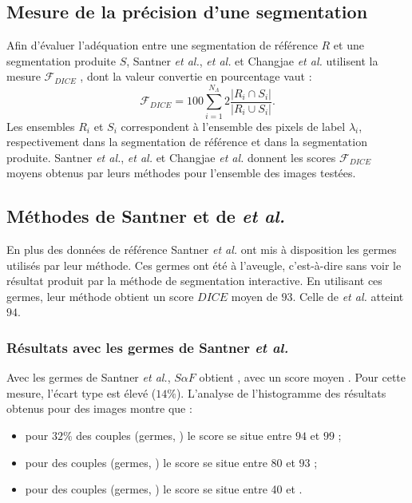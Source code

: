 \subsection{Mesure de la précision d'une segmentation}

Afin d'évaluer l'adéquation entre une segmentation de référence $R$ et une segmentation produite $S$, Santner \textit{et al.},   \textit{et al.} et Changjae \textit{et al.} utilisent la mesure $\mathcal{F}_{DICE}$ \cite{santner2010interactive}, dont la valeur convertie en pourcentage vaut :
\begin{equation}
\label{eq:dice}
\mathcal{F}_{DICE} = 100 \sum_{i=1}^{N_{\Lambda}} 2 \frac{|R_{i} \cap S_{i} |}{|R_{i} \cup S_{i}|}\text{.}
\end{equation}
Les ensembles $R_{i}$ et $S_{i}$ correspondent à l'ensemble des pixels de label $\lambda_{i}$, respectivement dans la segmentation de référence et dans la segmentation produite. Santner \textit{et al.},  \textit{et al.} et Changjae \textit{et al.} donnent les scores $\mathcal{F}_{DICE}$ moyens obtenus par leurs méthodes pour l'ensemble des images testées.


\subsection{Méthodes de Santner  et de  \textit{et al.}}

En plus des données de référence\modif{,} Santner \textit{et al.} \cite{santner2010interactive} ont mis à disposition les germes utilisés par leur méthode. Ces germes ont été  à l'aveugle, c'est-à-dire sans voir le résultat produit par la méthode de segmentation interactive. En utilisant ces germes, leur méthode obtient un score $DICE$ moyen de $93$. Celle de  \textit{et al.} \cite{muller2016robust} atteint $94$.


\subsubsection{Résultats avec les germes de Santner \textit{et al.}}

Avec les germes de Santner \textit{et al.}, $S \alpha F$ obtient , avec un score  moyen .  Pour cette mesure, l'écart type est élevé ($14 \%$). L'analyse de l'histogramme des résultats obtenus pour  des images montre que :
\begin{itemize}
\item pour $ 32  \%$ des couples (germes,  ) le score  se situe entre $94$ et $99$ ; 
\item pour  des couples (germes,  ) le score  se situe entre $80$ et $93$ ; 
\item pour  des couples (germes,  ) le score  se situe entre 40 et .
\end{itemize}

